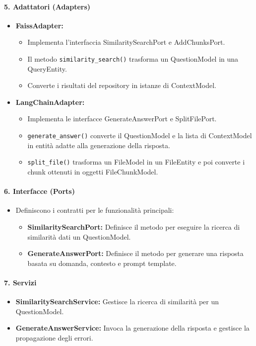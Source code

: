 \paragraph{5. Adattatori (Adapters)}
\begin{itemize}
    \item \textbf{FaissAdapter:}
    \begin{itemize}
        \item Implementa l’interfaccia SimilaritySearchPort e AddChunksPort.
        \item Il metodo \texttt{similarity\_search()} trasforma un QuestionModel in una QueryEntity.
        \item Converte i risultati del repository in istanze di ContextModel.
    \end{itemize}
    \item \textbf{LangChainAdapter:}
    \begin{itemize}
        \item Implementa le interfacce GenerateAnswerPort e SplitFilePort.
        \item \texttt{generate\_answer()} converte il QuestionModel e la lista di ContextModel in entità adatte alla generazione della risposta.
        \item \texttt{split\_file()} trasforma un FileModel in un FileEntity e poi converte i chunk ottenuti in oggetti FileChunkModel.
    \end{itemize}
\end{itemize}

\paragraph{6. Interfacce (Ports)}
\begin{itemize}
    \item Definiscono i contratti per le funzionalità principali:
    \begin{itemize}
        \item \textbf{SimilaritySearchPort:} Definisce il metodo per eseguire la ricerca di similarità dati un QuestionModel.
        \item \textbf{GenerateAnswerPort:} Definisce il metodo per generare una risposta basata su domanda, contesto e prompt template.
    \end{itemize}
\end{itemize}

\paragraph{7. Servizi}
\begin{itemize}
    \item \textbf{SimilaritySearchService:} Gestisce la ricerca di similarità per un QuestionModel.
    \item \textbf{GenerateAnswerService:} Invoca la generazione della risposta e gestisce la propagazione degli errori.
\end{itemize}

